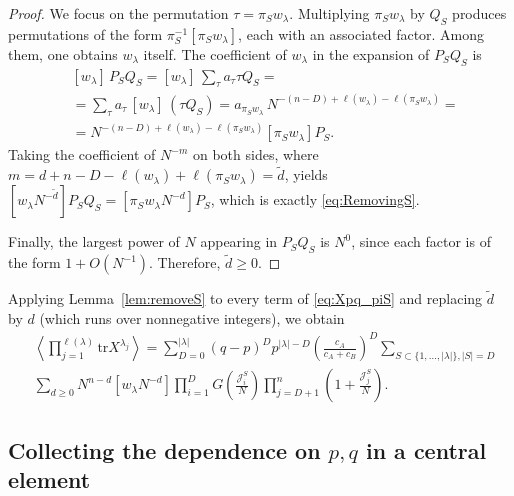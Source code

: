 \documentclass{article}
\newcommand{\tr}{\mathrm{tr}}
\theoremstyle{plain}
\theoremstyle{definition}
\numberwithin{equation}{section}
\begin{document}
\begin{proof}
We focus on the permutation $\tau=\pi_S w_\lambda$. Multiplying $\pi_S w_\lambda$ by $Q_S$ produces permutations of the form $\pi_S^{-1}[\pi_S w_\lambda]$, each with an associated factor. Among them, one obtains $w_\lambda$ itself. The coefficient of $w_\lambda$ in the expansion of $P_SQ_S$ is
\begin{equation}
    \begin{aligned}
        &[w_\lambda]\,P_SQ_S = [w_\lambda]\,\sum_{\tau}a_\tau \tau Q_S= \\
        & = \sum_{\tau}a_\tau\,[w_\lambda]\,(\tau Q_S)
    = a_{\pi_S w_\lambda}\, N^{-(n-D)+\ell(w_\lambda)-\ell(\pi_S w_\lambda)} = \\
        & = N^{-(n-D)+\ell(w_\lambda)-\ell(\pi_S w_\lambda)} [\pi_S w_\lambda] P_S.
    \end{aligned}
\end{equation}
Taking the coefficient of $N^{-m}$ on both sides, where
$m=d+n-D-\ell(w_\lambda)+\ell(\pi_S w_\lambda)=\tilde d$,
yields
$[w_\lambda N^{-\tilde d}]P_SQ_S=[\pi_S w_\lambda N^{-d}]P_S$,
which is exactly \eqref{eq:RemovingS}.

    Finally, the largest power of $N$ appearing in $P_SQ_S$ is $N^0$, since each factor is of the form $1+O(N^{-1})$. Therefore, $\tilde d\ge 0$.
\end{proof}

Applying Lemma~\ref{lem:removeS} to every term of \eqref{eq:Xpq_piS} and replacing $\tilde d$ by $d$ (which runs over nonnegative integers), we obtain
\begin{equation}
    \label{eq:Xpq_w_lambda factors not in coef}
    \begin{aligned}
        & \left\langle \prod_{j=1}^{\ell(\lambda)} \tr X^{\lambda_{j}} \right\rangle = \sum_{D=0}^{|\lambda|} (q-p)^{D} p^{|\lambda|-D} \left(\frac{c_{A}}{c_{A}+c_{B}}\right)^{D} \sum_{S\subset \{1,\dots,|\lambda|\}, |S| = D}\\
        & \sum\limits_{d\ge 0}   N^{n- d} [w_\lambda N^{-d}] \prod_{i=1}^{D} G\left(\frac{\mathcal{J}_{i}^S}{N} \right)\prod_{j=D+1}^n \left(1+\frac{\mathcal{J}_{j}^S}{N}\right).
    \end{aligned}
\end{equation}

\subsection{Collecting the dependence on $p,q$ in a central element}
\label{subs:central}
\end{document}
